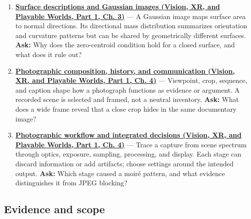 \begin{enumerate}
  \textbf{\href{../07-Vision-XR-and-Playable-Worlds-P01/main.pdf\#nameddest=04-visual-computing-ii-ch032-shape-from-shading-and-reflectance}{Shape from shading and reflectance (Vision, XR, and Playable Worlds, Part 1, Ch. 3)}} --- A single shading image gives a nonlinear relation among surface normal, reflectance, and illumination; integration into height requires boundary conditions and extra assumptions. \textbf{Ask:} Why does a locally valid normal field fail to guarantee one globally consistent surface?
\item
  \textbf{\href{../07-Vision-XR-and-Playable-Worlds-P01/main.pdf\#nameddest=04-visual-computing-ii-ch032-surface-descriptions-and-gaussian-images}{Surface descriptions and Gaussian images (Vision, XR, and Playable Worlds, Part 1, Ch. 3)}} --- A Gaussian image maps surface area to normal directions. Its directional mass distribution summarizes orientation and curvature patterns but can be shared by geometrically different surfaces. \textbf{Ask:} Why does the zero-centroid condition hold for a closed surface, and what does it rule out?
\item
  \textbf{\href{../07-Vision-XR-and-Playable-Worlds-P01/main.pdf\#nameddest=04-visual-computing-ii-ch034-photographic-composition-history-and-communication}{Photographic composition, history, and communication (Vision, XR, and Playable Worlds, Part 1, Ch. 4)}} --- Viewpoint, crop, sequence, and caption shape how a photograph functions as evidence or argument. A recorded scene is selected and framed, not a neutral inventory. \textbf{Ask:} What does a wide frame reveal that a close crop hides in the same documentary image?
\item
  \textbf{\href{../07-Vision-XR-and-Playable-Worlds-P01/main.pdf\#nameddest=04-visual-computing-ii-ch034-photographic-workflow-and-integrated-decisions}{Photographic workflow and integrated decisions (Vision, XR, and Playable Worlds, Part 1, Ch. 4)}} --- Trace a capture from scene spectrum through optics, exposure, sampling, processing, and display. Each stage can discard information or add artifacts; choose settings around the intended output. \textbf{Ask:} Which stage caused a moiré pattern, and what evidence distinguishes it from JPEG blocking?
\end{enumerate}

\subsection{Evidence and scope}\label{appendix-a8f634b076b5-evidence-and-scope}

